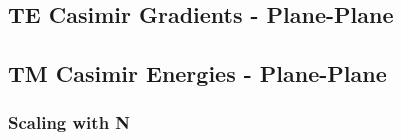 \subsection{TE Casimir Gradients - Plane-Plane}




\subsection{TM Casimir Energies - Plane-Plane}

\subsubsection{Scaling with N}


    






